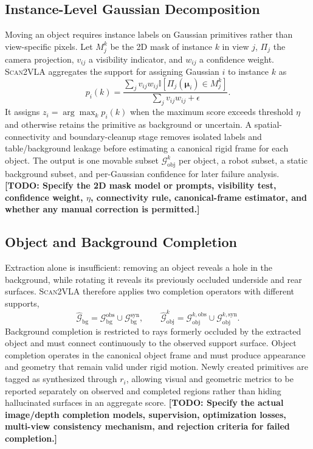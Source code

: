 \documentclass[letterpaper,10pt,conference]{ieeeconf}
\newcommand{\system}{\textsc{Scan2VLA}}
\newcommand{\todo}[1]{\textbf{[TODO: #1]}}
\begin{document}
\subsection{Instance-Level Gaussian Decomposition}
\label{sec:decomposition}
Moving an object requires instance labels on Gaussian primitives rather than
view-specific pixels. Let $M_j^k$ be the 2D mask of instance $k$ in view $j$,
$\Pi_j$ the camera projection, $v_{ij}$ a visibility indicator, and $w_{ij}$ a
  confidence weight. \system{} aggregates the support for assigning Gaussian $i$ to
instance $k$ as
\begin{equation}
  p_i(k)=
  \frac{\sum_j v_{ij}w_{ij}
  \mathbb{I}[\Pi_j(\boldsymbol{\mu}_i)\in M_j^k]}
  {\sum_j v_{ij}w_{ij}+\epsilon}.
  \label{eq:instance-vote}
\end{equation}
It assigns $z_i=\arg\max_k p_i(k)$ when the maximum score exceeds threshold
$\eta$ and otherwise retains the primitive as background or uncertain. A
spatial-connectivity and boundary-cleanup stage removes isolated labels and
table/background leakage before estimating a canonical rigid frame for each
object. The output is one movable subset $\mathcal{G}_{\mathrm{obj}}^k$ per
object, a robot subset, a static background subset, and per-Gaussian confidence
for later failure analysis. \todo{Specify the 2D mask model or prompts,
visibility test, confidence weight, $\eta$, connectivity rule, canonical-frame
estimator, and whether any manual correction is permitted.}

\subsection{Object and Background Completion}
Extraction alone is insufficient: removing an object reveals a hole in the
background, while rotating it reveals its previously occluded underside and
  rear surfaces. \system{} therefore applies two completion operators with different
supports,
\begin{equation}
  \widehat{\mathcal{G}}_{\mathrm{bg}}
  =\mathcal{G}_{\mathrm{bg}}^{\mathrm{obs}}
  \cup\mathcal{G}_{\mathrm{bg}}^{\mathrm{syn}},\qquad
  \widehat{\mathcal{G}}_{\mathrm{obj}}^k
  =\mathcal{G}_{\mathrm{obj}}^{k,\mathrm{obs}}
  \cup\mathcal{G}_{\mathrm{obj}}^{k,\mathrm{syn}}.
  \label{eq:completion}
\end{equation}
Background completion is restricted to rays formerly occluded by the extracted
object and must connect continuously to the observed support surface. Object
completion operates in the canonical object frame and must produce appearance
and geometry that remain valid under rigid motion. Newly created primitives are
tagged as synthesized through $r_i$, allowing visual and geometric metrics to be
reported separately on observed and completed regions rather than hiding
hallucinated surfaces in an aggregate score. \todo{Specify the actual image/depth
completion models, supervision, optimization losses, multi-view consistency
mechanism, and rejection criteria for failed completion.}
\end{document}
